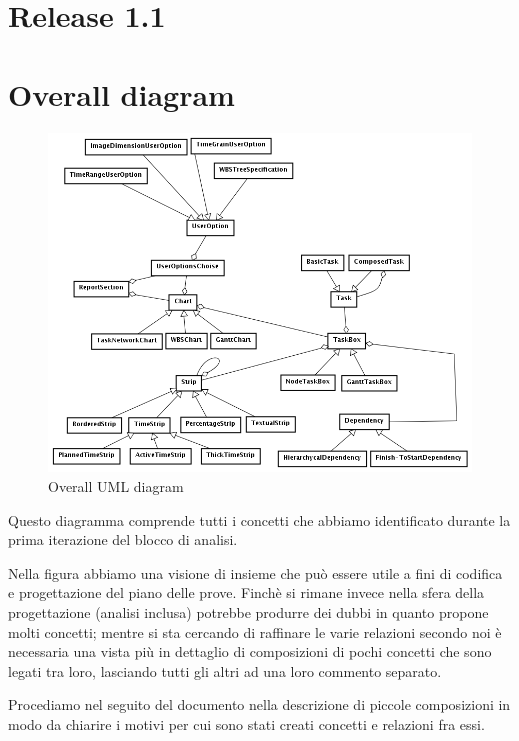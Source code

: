 \chapter*{Release \textbf{1.1}}

\chapter{Overall diagram}

\begin{figure}[h!] 
	\centering
	\includegraphics[width=1\textwidth]{../Milestone1-DomainModel/img/DomainModel.png}
	\caption{Overall UML diagram}
	\label{fig:overallDiagram} 
\end{figure}

Questo diagramma comprende tutti i concetti che abbiamo identificato durante la
prima iterazione del blocco di analisi. 

Nella figura abbiamo una visione di insieme che pu\`o essere utile a fini di
codifica e progettazione del piano delle prove. Finch\`e si rimane invece nella
sfera della progettazione (analisi inclusa) potrebbe produrre dei dubbi in
quanto propone molti concetti; mentre si sta cercando di raffinare le varie relazioni
secondo noi \`e necessaria una vista pi\`u in dettaglio di composizioni
di pochi concetti che sono legati tra loro, lasciando tutti gli altri ad una
loro commento separato.

Procediamo nel seguito del documento nella descrizione di piccole composizioni
in modo da chiarire i motivi per cui sono stati creati concetti e relazioni fra
essi.

